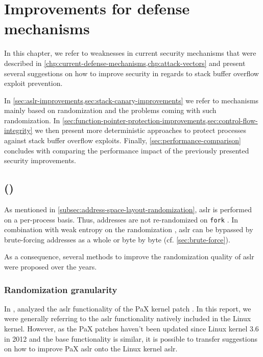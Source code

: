 \chapter{Improvements for defense mechanisms}
\label{chp:defense-mechanism-improvements}

In this chapter, we refer to weaknesses in current security mechanisms that were described in \cref{chp:current-defense-mechanisms,chp:attack-vectors} and present several suggestions on how to improve security in regards to stack buffer overflow exploit prevention.

In \cref{sec:aslr-improvements,sec:stack-canary-improvements} we refer to mechanisms mainly based on randomization and the problems coming with such randomization.
In \cref{sec:function-pointer-protection-improvements,sec:control-flow-integrity} we then present more deterministic approaches to protect processes against stack buffer overflow exploits.
Finally, \cref{sec:performance-comparison} concludes with comparing the performance impact of the previously presented security improvements.

\section{ ()}
\label{sec:aslr-improvements}

As mentioned in \cref{subsec:address-space-layout-randomization}, \gls{aslr} is performed on a per-process basis.
Thus, addresses are not re-randomized on \texttt{fork} \cite[1\psq]{Lu2016}.
In combination with weak entropy on the randomization \cites{MarcoGisbert2014}[3\psqq]{MarcoGisbert2016}, \gls{aslr} can be bypassed by brute-forcing addresses as a whole or byte by byte (cf. \cref{sec:brute-force}).

As a consequence, several methods to improve the randomization quality of \gls{aslr} were proposed over the years.

\subsection{Randomization granularity}
\label{subsec:randomization-granularity}

In \citeyear{Shacham2004}, \citeauthor{Shacham2004} analyzed the \gls{aslr} functionality of the PaX kernel patch \cite{Shacham2004}.
In this report, we were generally referring to the \gls{aslr} functionality natively included in the Linux kernel.
However, as the PaX patches haven't been updated since Linux kernel 3.6 in 2012 \cite{PaXTeam} and the base functionality is similar, it is possible to transfer suggestions on how to improve PaX \gls{aslr} onto the Linux kernel \gls{aslr}.

